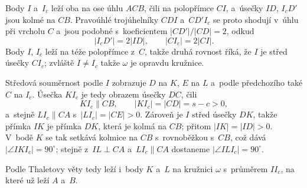 {    Body $I$ a~$I_c$ leží oba na ose úhlu $ACB$, čili na polopřímce $CI$, a~úsečky $ID$, $I_cD'$ jsou kolmé na $CB$. Pravoúhlé trojúhelníky $CDI$ a~$CD'I_c$ se proto shodují v~úhlu při vrcholu $C$ a~jsou podobné s~koeficientem $|CD'| / |CD| = 2$, odkud
    $$
    |I_cD'| = 2|ID|, \qquad |CI_c| = 2|CI|.
    $$
    Body $I$, $I_c$ leží na téže polopřímce z~$C$, takže druhá rovnost říká, že $I$ je střed úsečky $CI_c$; zvláště $I \neq I_c$ takže $\omega$ je opravdu kružnice.

    Středová souměrnost podle $I$ zobrazuje $D$ na $K$, $E$ na $L$ a~podle předchozího také $C$ na $I_c$. Úsečka $KI_c$ je tedy obrazem úsečky $DC$, čili
    $$
    KI_c \parallel CB, \qquad |KI_c| = |CD| = s - c > 0,
    $$
    a~stejně $LI_c \parallel CA$ s~$|LI_c| = |CE| > 0$. Zároveň je $I$ střed úsečky $DK$, takže přímka $IK$ je přímka $DK$, která je kolmá na $CB$; přitom $|IK| = |ID| > 0$. V~bodě $K$ se tak setkává kolmice na $CB$ s~rovnoběžkou s~$CB$, což dává $|\angle IKI_c| = 90^\circ$; stejně z~$IL \perp CA$ a~$LI_c \parallel CA$ dostaneme $|\angle ILI_c| = 90^\circ$.

    Podle Thaletovy věty tedy leží i~body $K$ a~$L$ na kružnici $\omega$ s~průměrem $II_c$, na které už leží $A$ a~$B$.
}

